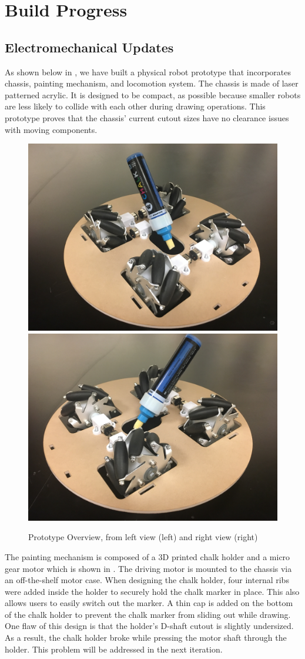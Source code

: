 
\section{Build Progress}
\label{sec:build_progress}


\subsection{Electromechanical Updates}
\label{sec:electromechanical_progress}
As shown below in , we have built a physical robot prototype that incorporates chassis, painting mechanism, and locomotion system. The chassis is made of laser patterned acrylic. It is designed to be compact, as possible because smaller robots are less likely to collide with each other during drawing operations. This prototype proves that the chassis’ current cutout sizes have no clearance issues with moving components. 

\begin{figure}[h!]
\centering
\includegraphics[width=0.49\columnwidth]{CAD/full_system_1.jpeg}
\includegraphics[width=0.49\columnwidth]{CAD/full_system_2.jpeg}
\label{fig:em1}
\caption{Prototype Overview, from left view (left) and right view (right)}
\end{figure}

The painting mechanism is composed of a 3D printed chalk holder and a micro gear motor which is shown in . The driving motor is mounted to the chassis via an off-the-shelf motor case. When designing the chalk holder, four internal ribs were added inside the holder to securely hold the chalk marker in place. This also allows users to easily switch out the marker. A thin cap is added on the bottom of the chalk holder to prevent the chalk marker from sliding out while drawing. One flaw of this design is that the holder’s D-shaft cutout is slightly undersized. As a result, the chalk holder broke while pressing the motor shaft through the holder. This problem will be addressed in the next iteration. 

